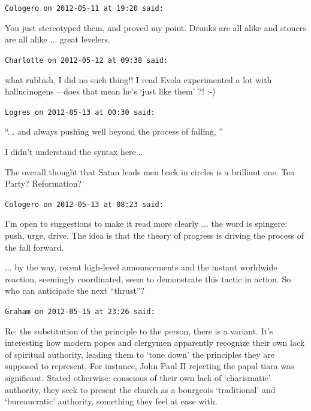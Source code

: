 \begin{footnotesize}
\begin{sffamily}
\hfill

\texttt{Cologero on 2012-05-11 at 19:20 said:}

You just stereotyped them, and proved my point. Drunks are all alike and stoners are all alike ... great levelers.

\hfill

\texttt{Charlotte on 2012-05-12 at 09:38 said:}

what rubbish, I did no such thing!! I read Evola experimented a lot with hallucinogens -- does that mean he's `just like them' ?! :-)

\hfill

\texttt{Logres on 2012-05-13 at 00:30 said:}

``... and always pushing well beyond the process of falling, ''

I didn't understand the syntax here... 

The overall thought that Satan leads men back in circles is a brilliant one. Tea Party? Reformation?

\hfill

\texttt{Cologero on 2012-05-13 at 08:23 said:}

I'm open to suggestions to make it read more clearly ... the word is spingere: push, urge, drive. The idea is that the theory of progress is driving the process of the fall forward.

... by the way, recent high-level announcements and the instant worldwide reaction, seemingly coordinated, seem to demonstrate this tactic in action. So who can anticipate the next ``thrust''?

\hfill

\texttt{Graham on 2012-05-15 at 23:26 said:}

Re: the substitution of the principle to the person, there is a variant. It's interesting how modern popes and clergymen apparently recognize their own lack of spiritual authority, leading them to `tone down' the principles they are supposed to represent. For instance, John Paul II rejecting the papal tiara was significant. Stated otherwise: conscious of their own lack of `charismatic' authority, they seek to present the church as a bourgeois `traditional' and `bureaucratic' authority, something they feel at ease with.

\hfill


\end{sffamily}
\end{footnotesize}


